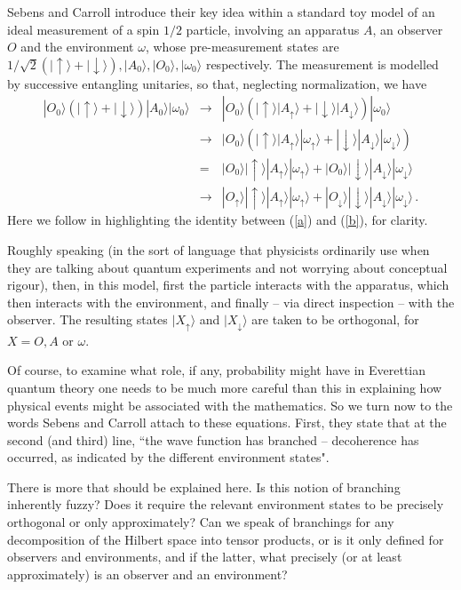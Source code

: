 \documentclass[aps,prl]{revtex4}
\def\ket#1{| #1\rangle}
\begin{document}
Sebens and Carroll \cite{cs2} introduce their key idea 
within a standard toy
model of an ideal measurement of a spin $1/2$ particle, 
involving an apparatus $A$, an observer $O$ and the environment
$\omega$, whose pre-measurement states are $ 1/\sqrt{2} (
\ket{\uparrow} + \ket{\downarrow} ), \ket{A_0}, \ket{O_0}, 
\ket{\omega_0}$ respectively.  The measurement is modelled
by successive entangling unitaries, so that, neglecting
normalization, we have
\begin{eqnarray}
\ket{O_0} ( \ket{ \uparrow } + \ket{ \downarrow }) \ket{A_0}
\ket{\omega_0} 
& \rightarrow & 
\ket{O_0} ( \ket{ \uparrow } \ket{A_{\uparrow}} + 
\ket{ \downarrow } \ket{A_{\downarrow}} ) 
\ket{\omega_0}  \\ 
& \rightarrow & 
\ket{O_0} ( \ket{ \uparrow } \ket{A_{\uparrow}}
\ket{\omega_{\uparrow}} + 
\ket{ \downarrow } \ket{A_{\downarrow}} \ket{\omega_{\downarrow}} ) \label{a} \\
& = & 
\ket{O_0}  \ket{ \uparrow } \ket{A_{\uparrow}}
\ket{\omega_{\uparrow}} + 
\ket{O_0} 
\ket{ \downarrow } \ket{A_{\downarrow}}
\ket{\omega_{\downarrow}}  \label{b} \\ 
& \rightarrow &
\ket{O_{\uparrow}}  \ket{ \uparrow } \ket{A_{\uparrow}}
\ket{\omega_{\uparrow}} + 
\ket{O_{\downarrow}}
\ket{ \downarrow } \ket{A_{\downarrow}} \ket{\omega_{\downarrow}} \,
. 
\end{eqnarray}
Here we follow \cite{cs2} in highlighting the identity 
between (\ref{a}) and (\ref{b}), for clarity.  

Roughly speaking (in the sort of language that physicists ordinarily 
use when they are talking about quantum experiments and not worrying about 
conceptual rigour), then,
in this model, first the particle interacts with the apparatus,
which then interacts with the environment, and finally -- 
via direct inspection -- with the observer.
The resulting states $\ket{X_{\uparrow}}$ and $\ket{X_{\downarrow}}$
are taken to be orthogonal, for $X = O, A$ or $\omega$.  

Of course, to examine what role, if any, probability might
have in Everettian quantum theory one needs to be much more
careful than this in explaining how physical events might be
associated with the mathematics.
So we turn now to the words Sebens and Carroll 
attach to these equations.  
First, they state that at 
the second (and third) line, 
``the wave function has
branched -- decoherence has occurred, as indicated by the 
different environment states".   

There is more that
should be explained here.  Is this notion
of branching inherently fuzzy?   Does it require
the relevant environment states to be precisely orthogonal
or only approximately?   Can we speak of branchings for 
any decomposition of the Hilbert space into tensor products,
or is it only defined for observers and environments, and
if the latter, what precisely (or at least approximately) is an observer
and an environment?  
\end{document}

